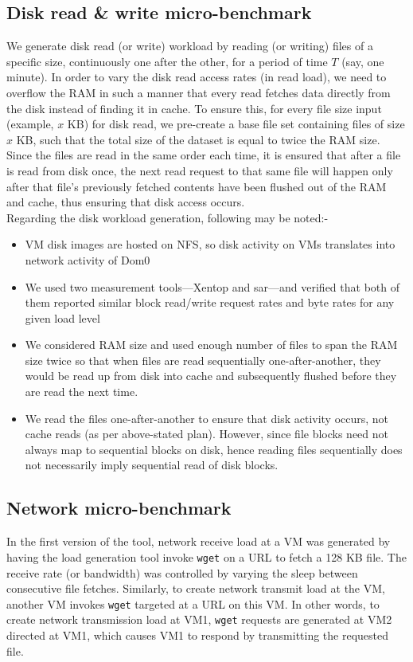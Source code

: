 \subsection{Disk read \& write micro-benchmark}
We generate disk read (or write) workload by reading 
(or writing) files of a specific size, continuously one after the other, 
for a period of time $T$ (say, one minute). 
In order to vary the disk read access rates (in read load), we need to
overflow the RAM in such a manner that every read fetches 
data directly from the disk instead of finding it in cache. To
ensure this, for every file size input (example, $x$ KB) for disk read, 
we pre-create a base file set
containing files of size $x$ KB, such that 
the total size of the dataset is equal to twice the RAM size.
Since the files are read in the same order each time, 
it is ensured that after a file is read from
disk once, the next read request to that same 
file will happen only after that file’s previously
fetched contents have been flushed out of the RAM and cache, 
thus ensuring that disk access occurs.
\\
Regarding the disk workload generation, following may be noted:-
\begin{itemize}
\item VM disk images are hosted on NFS, so disk activity on VMs translates 
into network activity of Dom0
\item We used two measurement tools---Xentop and sar---and verified that 
both of them reported similar block read/write request rates and byte rates 
for any given load level
\item We considered RAM size and used enough number of files to span the 
RAM size twice so that when files are read sequentially 
one-after-another, they would be read up from disk into cache and 
subsequently flushed before they are read the next time.
\item We read the files one-after-another to ensure that disk activity 
occurs, not cache reads (as per above-stated plan). However, since file 
blocks need not always map to sequential blocks on disk, hence reading 
files sequentially does not necessarily imply sequential read of disk blocks.
\end{itemize}

\subsection{Network micro-benchmark}
In the first version of the tool, 
network receive load at a VM was generated by having the load generation
tool invoke \texttt{wget} on a URL to fetch a 128 KB file. 
The receive rate (or bandwidth) was controlled
by varying the sleep between consecutive file fetches. 
Similarly, to create network transmit load
at the VM, another VM invokes \texttt{wget} targeted at a 
URL on this VM. In other words, to create network
transmission load at VM1, \texttt{wget} requests are
generated at VM2 directed at VM1, which causes
VM1 to respond by transmitting the requested file. 
	
